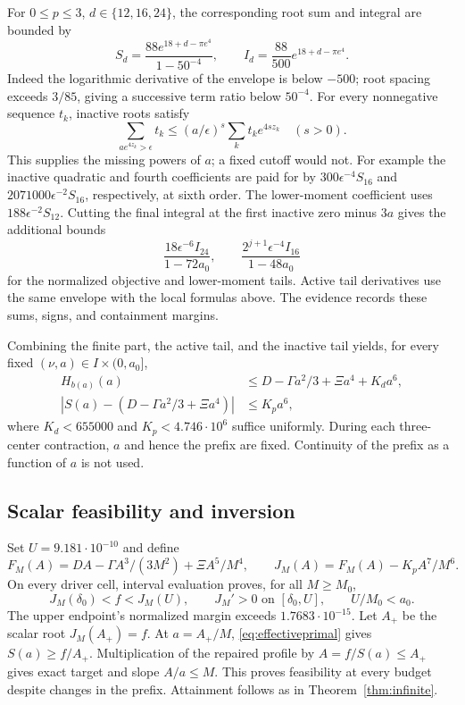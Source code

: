 For \(0\leq p\leq3\), \(d\in\{12,16,24\}\), the corresponding root
sum and integral are bounded by
\[
 S_d=\frac{88e^{18+d-\pi e^4}}{1-50^{-4}},\qquad
 I_d=\frac{88}{500}e^{18+d-\pi e^4}.
\]
Indeed the logarithmic derivative of the envelope is below \(-500\);
root spacing exceeds \(3/85\), giving a successive term ratio below
\(50^{-4}\).
For every nonnegative sequence \(t_k\), inactive roots satisfy
\[
 \sum_{ae^{4z_k}>\epsilon}t_k
       \leq(a/\epsilon)^s\sum_k t_ke^{4sz_k}\quad(s>0).
\]
This supplies the missing powers of \(a\); a fixed cutoff would not.
For example the inactive quadratic and fourth coefficients are paid for
by \(300\epsilon^{-4}S_{16}\) and
\(2071000\epsilon^{-2}S_{16}\), respectively, at sixth order.
The lower-moment coefficient uses \(188\epsilon^{-2}S_{12}\).
Cutting the final integral at the first inactive zero minus \(3a\)
gives the additional bounds
\[
 \frac{18\epsilon^{-6}I_{24}}{1-72a_0},\qquad
 \frac{2^{j+1}\epsilon^{-4}I_{16}}{1-48a_0}
\]
for the normalized objective and lower-moment tails.
Active tail derivatives use the same envelope with the local formulas
above. The evidence records these sums, signs, and containment margins.

Combining the finite part, the active tail, and the inactive tail yields,
for every fixed \((\nu,a)\in I\times(0,a_0]\),
\begin{align}
 H_{b(a)}(a)&\leq D-\Gamma a^2/3+\Xi a^4+K_da^6,\label{eq:effectivesupport}\\
 |S(a)-(D-\Gamma a^2/3+\Xi a^4)|&\leq K_pa^6,\label{eq:effectiveprimal}
\end{align}
where \(K_d<655000\) and \(K_p<4.746\cdot10^6\) suffice uniformly.
During each three-center contraction, \(a\) and hence the prefix are
fixed. Continuity of the prefix as a function of \(a\) is not used.

\subsection{Scalar feasibility and inversion}
Set \(U=9.181\cdot10^{-10}\) and define
\[
 F_M(A)=DA-\Gamma A^3/(3M^2)+\Xi A^5/M^4,\qquad
 J_M(A)=F_M(A)-K_pA^7/M^6.
\]
On every driver cell, interval evaluation proves, for all \(M\geq M_0\),
\[
 J_M(\delta_0)<f<J_M(U),\qquad J_M'>0\text{ on }[\delta_0,U],
 \qquad U/M_0<a_0.
\]
The upper endpoint's normalized margin exceeds \(1.7683\cdot10^{-15}\).
Let \(A_+\) be the scalar root \(J_M(A_+)=f\).
At \(a=A_+/M\), \eqref{eq:effectiveprimal} gives \(S(a)\geq f/A_+\).
Multiplication of the repaired profile by \(A=f/S(a)\leq A_+\)
gives exact target and slope \(A/a\leq M\). This proves feasibility
at every budget despite changes in the prefix. Attainment follows as
in Theorem~\ref{thm:infinite}.

